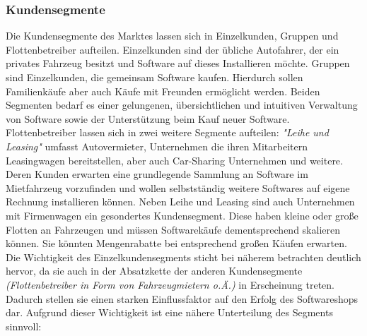 \subsubsection{Kundensegmente}
Die Kundensegmente des Marktes lassen sich in Einzelkunden, Gruppen und Flottenbetreiber aufteilen. Einzelkunden sind der übliche Autofahrer, der ein privates Fahrzeug besitzt und Software auf dieses Installieren möchte. Gruppen sind Einzelkunden, die gemeinsam Software kaufen. Hierdurch sollen Familienkäufe aber auch Käufe mit Freunden ermöglicht werden. Beiden Segmenten bedarf es einer gelungenen, übersichtlichen und intuitiven Verwaltung von Software sowie der Unterstützung beim Kauf neuer Software. Flottenbetreiber lassen sich in zwei weitere Segmente aufteilen: \textit{"Leihe und Leasing"} umfasst Autovermieter, Unternehmen die ihren Mitarbeitern Leasingwagen bereitstellen, aber auch Car-Sharing Unternehmen und weitere. Deren Kunden erwarten eine grundlegende Sammlung an Software im Mietfahrzeug vorzufinden und wollen selbstständig weitere Softwares auf eigene Rechnung installieren können. Neben Leihe und Leasing sind auch Unternehmen mit Firmenwagen ein gesondertes Kundensegment. Diese haben kleine oder große Flotten an Fahrzeugen und müssen Softwarekäufe dementsprechend skalieren können. Sie könnten Mengenrabatte bei entsprechend großen Käufen erwarten.\\
Die Wichtigkeit des Einzelkundensegments sticht bei näherem betrachten deutlich hervor, da sie auch in der Absatzkette der anderen Kundensegmente \textit{(Flottenbetreiber in Form von Fahrzeugmietern o.Ä.)} in Erscheinung treten. Dadurch stellen sie einen starken Einflussfaktor auf den Erfolg des Softwareshops dar. Aufgrund dieser Wichtigkeit ist eine nähere Unterteilung des Segments sinnvoll:\\
